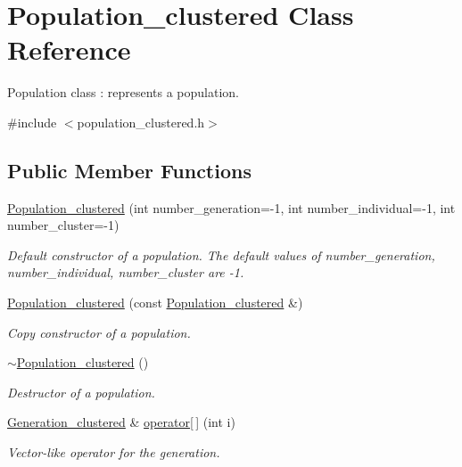 \hypertarget{class_population__clustered}{}\section{Population\+\_\+clustered Class Reference}
\label{class_population__clustered}


Population class \+: represents a population.  




{\ttfamily \#include $<$population\+\_\+clustered.\+h$>$}

\subsection*{Public Member Functions}
\begin{DoxyCompactItemize}
\item 
\hyperlink{class_population__clustered_a53e9a4efeb00daff22df130e1db05b2e}{Population\+\_\+clustered} (int number\+\_\+generation=-\/1, int number\+\_\+individual=-\/1, int number\+\_\+cluster=-\/1)
\begin{DoxyCompactList}\small\item\em Default constructor of a population. The default values of number\+\_\+generation, number\+\_\+individual, number\+\_\+cluster are -\/1. \end{DoxyCompactList}\item 
\hyperlink{class_population__clustered_a1d814b2036636b91d4c7c6f76a0d139a}{Population\+\_\+clustered} (const \hyperlink{class_population__clustered}{Population\+\_\+clustered} \&)
\begin{DoxyCompactList}\small\item\em Copy constructor of a population. \end{DoxyCompactList}\item 
\hyperlink{class_population__clustered_a23654097e2f4f6dad08556996f6434c4}{$\sim$\+Population\+\_\+clustered} ()
\begin{DoxyCompactList}\small\item\em Destructor of a population. \end{DoxyCompactList}\item 
\hyperlink{class_generation__clustered}{Generation\+\_\+clustered} \& \hyperlink{class_population__clustered_aa7600f7b8134b9371b593a00a7d67086}{operator\mbox{[}$\,$\mbox{]}} (int i)
\begin{DoxyCompactList}\small\item\em Vector-\/like operator for the generation. \end{DoxyCompactList}\item 

\end{DoxyCompactItemize}
